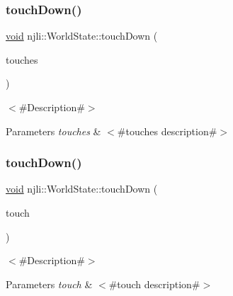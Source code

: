 \subsubsection{\texorpdfstring{touch\+Down()}{touchDown()}\hspace{0.1cm}{\footnotesize\ttfamily [1/2]}}
{\footnotesize\ttfamily \mbox{\hyperlink{_thread_8h_af1e856da2e658414cb2456cb6f7ebc66}{void}} njli\+::\+World\+State\+::touch\+Down (\begin{DoxyParamCaption}\item[{\mbox{\hyperlink{classnjli_1_1_device_touch}{Device\+Touch}} $\ast$$\ast$}]{touches }\end{DoxyParamCaption})}

$<$\#\+Description\#$>$


\begin{DoxyParams}{Parameters}
{\em touches} & $<$\#touches description\#$>$ \\
\hline
\end{DoxyParams}
\mbox{\label{classnjli_1_1_world_state_a9b50810d0cb3f5d756957b549c160729}} 
\subsubsection{\texorpdfstring{touch\+Down()}{touchDown()}\hspace{0.1cm}{\footnotesize\ttfamily [2/2]}}
{\footnotesize\ttfamily \mbox{\hyperlink{_thread_8h_af1e856da2e658414cb2456cb6f7ebc66}{void}} njli\+::\+World\+State\+::touch\+Down (\begin{DoxyParamCaption}\item[{const \mbox{\hyperlink{classnjli_1_1_device_touch}{Device\+Touch}} \&}]{touch }\end{DoxyParamCaption})}

$<$\#\+Description\#$>$


\begin{DoxyParams}{Parameters}
{\em touch} & $<$\#touch description\#$>$ \\
\hline
\end{DoxyParams}
\mbox{\label{classnjli_1_1_world_state_ab63260d4fe164df5218bb069bb0a70c1}} 
